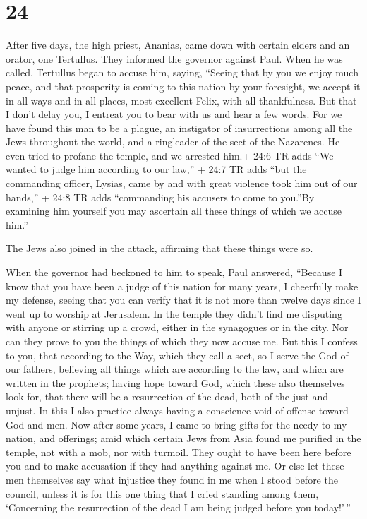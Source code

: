 \hypertarget{section-23}{%
\section{24}\label{section-23}}

 After five days, the high priest, Ananias, came down with
certain elders and an orator, one Tertullus. They informed the governor
against Paul.  When he was called, Tertullus began to accuse
him, saying, ``Seeing that by you we enjoy much peace, and that
prosperity is coming to this nation by your foresight,  we
accept it in all ways and in all places, most excellent Felix, with all
thankfulness.  But that I don't delay you, I entreat you to
bear with us and hear a few words.  For we have found this
man to be a plague, an instigator of insurrections among all the Jews
throughout the world, and a ringleader of the sect of the Nazarenes.
 He even tried to profane the temple, and we arrested him.+
24:6 TR adds ``We wanted to judge him according to our law,''
 + 24:7 TR adds ``but the commanding officer, Lysias, came
by and with great violence took him out of our hands,''  +
24:8 TR adds ``commanding his accusers to come to you.''By examining him
yourself you may ascertain all these things of which we accuse him.''

 The Jews also joined in the attack, affirming that these
things were so.

 When the governor had beckoned to him to speak, Paul
answered, ``Because I know that you have been a judge of this nation for
many years, I cheerfully make my defense,  seeing that you
can verify that it is not more than twelve days since I went up to
worship at Jerusalem.  In the temple they didn't find me
disputing with anyone or stirring up a crowd, either in the synagogues
or in the city.  Nor can they prove to you the things of
which they now accuse me.  But this I confess to you, that
according to the Way, which they call a sect, so I serve the God of our
fathers, believing all things which are according to the law, and which
are written in the prophets;  having hope toward God, which
these also themselves look for, that there will be a resurrection of the
dead, both of the just and unjust.  In this I also practice
always having a conscience void of offense toward God and men.
 Now after some years, I came to bring gifts for the needy
to my nation, and offerings;  amid which certain Jews from
Asia found me purified in the temple, not with a mob, nor with turmoil.
 They ought to have been here before you and to make
accusation if they had anything against me.  Or else let
these men themselves say what injustice they found in me when I stood
before the council,  unless it is for this one thing that I
cried standing among them, `Concerning the resurrection of the dead I am
being judged before you today!'\,''

